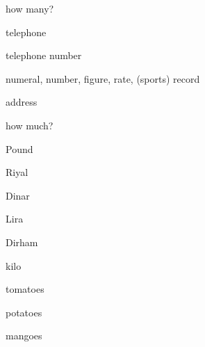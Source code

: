 \documentclass[avery5371,grid,frame]{flashcards}
\begin{document}
\begin{flashcard}{\LARGE how many?}
\LARGE {}
\end{flashcard}
\begin{flashcard}{\LARGE telephone}
\LARGE {}
\end{flashcard}
\begin{flashcard}{\LARGE telephone number}
\LARGE {}
\end{flashcard}
\begin{flashcard}{\LARGE numeral, number, figure, rate, (sports) record}
\LARGE {}
\end{flashcard}
\begin{flashcard}{\LARGE address}
\LARGE {}
\end{flashcard}
\begin{flashcard}{\LARGE how much?}
\LARGE {}
\end{flashcard}
\begin{flashcard}{\LARGE Pound}
\LARGE {}
\end{flashcard}
\begin{flashcard}{\LARGE Riyal}
\LARGE {}
\end{flashcard}
\begin{flashcard}{\LARGE Dinar}
\LARGE {}
\end{flashcard}
\begin{flashcard}{\LARGE Lira}
\LARGE {}
\end{flashcard}
\begin{flashcard}{\LARGE Dirham}
\LARGE {}
\end{flashcard}
\begin{flashcard}{\LARGE kilo}
\LARGE {}
\end{flashcard}
\begin{flashcard}{\LARGE tomatoes}
\LARGE {}
\end{flashcard}
\begin{flashcard}{\LARGE potatoes}
\LARGE {}
\end{flashcard}
\begin{flashcard}{\LARGE mangoes}
\LARGE {}
\end{flashcard}
\end{document}
